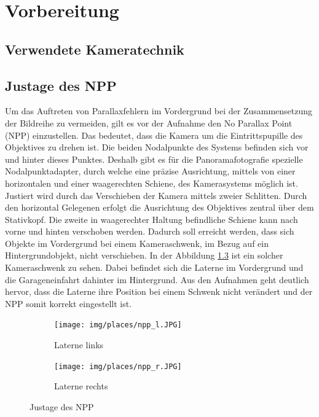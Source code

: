 \documentclass[liststotoc,bibtotoc,fontsize=14pt,]{scrreprt}
\begin{document}
	\chapter{Vorbereitung}
	\label{ch:vorbereitung}
	
	\section{Verwendete Kameratechnik}
	\label{sec:technik}
	
	\section{Justage des NPP}
	\label{sec:npp}
	Um das Auftreten von Parallaxfehlern im Vordergrund bei der Zusammensetzung der Bildreihe zu vermeiden, gilt es vor der Aufnahme den No Parallax Point (NPP) einzustellen. Das bedeutet, dass die Kamera um die Eintrittspupille des Objektives zu drehen ist. Die beiden Nodalpunkte des Systems befinden sich vor und hinter dieses Punktes. Deshalb gibt es für die Panoramafotografie spezielle Nodalpunktadapter, durch welche eine präzise Ausrichtung, mittels von einer horizontalen und einer waagerechten Schiene, des Kamerasystems möglich ist.
	\bigskip
	Justiert wird durch das Verschieben der Kamera mittels zweier Schlitten. Durch den horizontal Gelegenen erfolgt die Ausrichtung des Objektives zentral über dem Stativkopf. Die zweite in waagerechter Haltung befindliche Schiene kann nach vorne und hinten verschoben werden. Dadurch soll erreicht werden, dass sich Objekte im Vordergrund bei einem Kameraschwenk, im Bezug auf ein Hintergrundobjekt, nicht verschieben. In der Abbildung \ref{fig:justage} ist ein solcher Kameraschwenk zu sehen. Dabei befindet sich die Laterne im Vordergrund und die Garageneinfahrt dahinter im Hintergrund. Aus den Aufnahmen geht deutlich hervor, dass die Laterne ihre Position bei einem Schwenk nicht verändert und der NPP somit korrekt eingestellt ist.
	
	
	\begin{figure}[H]
		\begin{subfigure}[b]{0.5\textwidth}
			\texttt{[image: img/places/npp\_l.JPG]}
			\caption{Laterne links}
			\label{fig:npp_l}
		\end{subfigure}
		\hfill
		\begin{subfigure}[b]{0.5\textwidth}
			\texttt{[image: img/places/npp\_r.JPG]}
			\caption{Laterne rechts}
			\label{fig:npp_r}
		\end{subfigure}
		\caption{Justage des NPP}
		\label{fig:justage}
	\end{figure}
	
\end{document}
